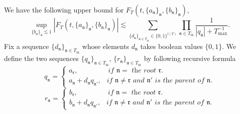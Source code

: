 \begin{lem}\label{lem.boundcoef'}
We have the following upper bound for $F_{T}(t,\{a_{\mathfrak{n}}\}_{\mathfrak{n}},\{b_{\mathfrak{n}}\}_{\mathfrak{n}})$,
\begin{equation}\label{eq.boundcoef'}
    \sup_{\{b_{\mathfrak{n}}\}_{\mathfrak{n}}\lesssim 1} |F_{T}(t,\{a_{\mathfrak{n}}\}_{\mathfrak{n}},\{b_{\mathfrak{n}}\}_{\mathfrak{n}})|\lesssim \sum_{\{d_{\mathfrak{n}}\}_{\mathfrak{n}\in T_{\text{in}}}\in\{0,1\}^{l(T)}}\prod_{\mathfrak{n}\in T_{\text{in}}}\frac{1}{|q_{\mathfrak{n}}|+T^{-1}_{\text{max}}}.
\end{equation}
Fix a sequence $\{d_{\mathfrak{n}}\}_{\mathfrak{n}\in T_{\text{in}}}$ whose elements $d_{\mathfrak{n}}$ takes boolean values $\{0,1\}$. We define the two sequences $\{q_{\mathfrak{n}}\}_{\mathfrak{n}\in T_{\text{in}}}$, $\{r_{\mathfrak{n}}\}_{\mathfrak{n}\in T_{\text{in}}}$ by following recursive formula
\begin{equation}\label{eq.q_n'}
    q_{\mathfrak{n}}=
    \begin{cases}
    a_{\mathfrak{r}}, \qquad\qquad \textit{ if $\mathfrak{n}=$ the root $\mathfrak{r}$.}
    \\
    a_{\mathfrak{n}}+d_{\mathfrak{n}}q_{\mathfrak{n}'},\ \ \textit{ if $\mathfrak{n}\neq\mathfrak{r}$ and $\mathfrak{n}'$ is the parent of $\mathfrak{n}$.}
    \end{cases}
\end{equation}
\begin{equation}\label{eq.r_n'}
    r_{\mathfrak{n}}=
    \begin{cases}
    b_{\mathfrak{r}}, \qquad\qquad \textit{ if $\mathfrak{n}=$ the root $\mathfrak{r}$.}
    \\
    b_{\mathfrak{n}}+d_{\mathfrak{n}}q_{\mathfrak{n}'},\ \ \textit{ if $\mathfrak{n}\neq\mathfrak{r}$ and $\mathfrak{n}'$ is the parent of $\mathfrak{n}$.}
    \end{cases}
\end{equation}

\end{lem}
